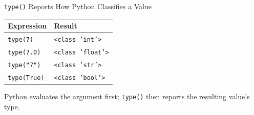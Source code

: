 \documentclass[aspectratio=169,10pt]{beamer}
\begin{document}
\begin{frame}{\texttt{type()} Reports How Python Classifies a Value}

  \begin{center}

    \begin{tabular}{l l}
      \textbf{Expression} & \textbf{Result} \\
      \hline
      \texttt{type(7)} & \texttt{<class 'int'>} \\
      \texttt{type(7.0)} & \texttt{<class 'float'>} \\
      \texttt{type("7")} & \texttt{<class 'str'>} \\
      \texttt{type(True)} & \texttt{<class 'bool'>} \\
    \end{tabular}

  \end{center}

  \begin{keyidea}

    Python evaluates the argument first; \texttt{type()} then reports the resulting value's type.

  \end{keyidea}

\end{frame}

\end{document}
